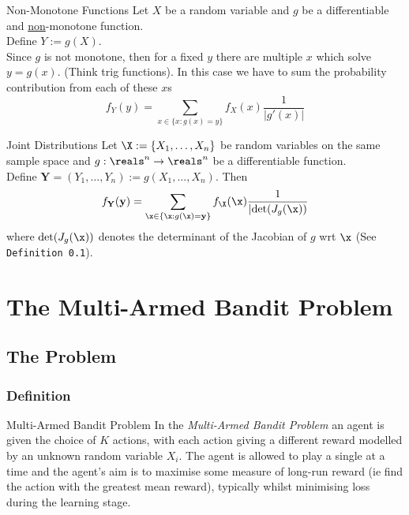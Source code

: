 \documentclass[11pt,a4paper]{article}
\begin{document}
  \begin{theorem}{Non-Monotone Functions}
    Let $X$ be a random variable and $g$ be a differentiable and \underline{non}-monotone function.\\
    Define $Y:=g(X)$.\\
    Since $g$ is not monotone, then for a fixed $y$ there are multiple $x$ which solve $y=g(x)$. (Think trig functions). In this case we have to sum the probability contribution from each of these $x$s
    \[ f_Y(y)=\sum_{x\in\{x:g(x)=y\}}f_X(x)\frac{1}{|g'(x)|} \]
  \end{theorem}

  \begin{theorem}{Joint Distributions}
    Let $\X:=\{X_1,\dots,X_n\}$ be random variables on the same sample space and $g:\reals^n\to\reals^n$ be a differentiable function.\\
    Define $\mathbf{Y}=(Y_1,\dots,Y_n):=g(X_1,\dots,X_n)$. Then
    \[ f_\mathbf{Y}(\mathbf{y})=\sum_{\x\in\{\x:g(\x)=\mathbf{y}\}}f_\X(\x)\frac1{|\text{det}(J_g(\x))} \]
    where $\text{det}(J_g(\x))$ denotes the determinant of the Jacobian of $g$ wrt $\x$ (See \texttt{Definition 0.1}).
  \end{theorem}


\section{The Multi-Armed Bandit Problem}

\subsection{The Problem}

  \subsubsection*{Definition}

  \begin{definition}{Multi-Armed Bandit Problem}
    In the \textit{Multi-Armed Bandit Problem} an agent is given the choice of $K$ actions, with each action giving a different reward modelled by an unknown random variable $X_i$. The agent is allowed to play a single at a time and the agent's aim is to maximise some measure of long-run reward (ie find the action with the greatest mean reward), typically whilst minimising loss during the learning stage.
  \end{definition}
\end{document}
